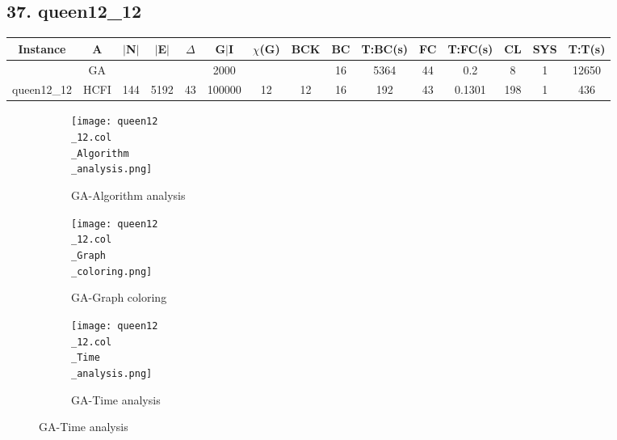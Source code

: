 \documentclass[10pt]{article}
\begin{document}
\subsection*{\hspace{0,9073976cm} 37. queen12\_12}
\begin{table}[H]
\centering
\begin{tabular}{|c|c|c|c|c|c|c|c|c|c|c|c|c|c|c|}
\hline
Instance& A &$|$N$|$ & $|$E$|$ & $\Delta$ & G$|$I & $\chi$(G) &BCK&BC & T:BC(s) & FC & T:FC(s) & CL & SYS & T:T(s) \\ \hline \hline

	&GA&       &                   &                     &   2000      &     \cellcolor{yellow} & {\cellcolor{yellow}}& {{\cellcolor{green}16}}
&5364   &44        &0.2                   &8                    &1          &12650        \\ \cline{2-2} \cline{6-6} \cline{9-15}
 \multirow{-2}{*}{queen12\_12} &HCFI   &\multirow{-2}{*}{144}   &\multirow{-2}{*}{5192}     &\multirow{-2}{*}{43}     &100000     &\multirow{-2}{*}{\cellcolor{yellow}12}      & \multirow{-2}{*}{\cellcolor{yellow}12}    &{\cellcolor{green}16}     &192         &43    &0.1301         &198    &1     &436        \\ \hline 
\end{tabular}
\end{table}
\graphicspath{{./Core1/Solutions/GA/queen12\_12.col}}
\begin{figure}[H]
\begin{subfigure}{.33\textwidth}
  \centering
  \texttt{[image: queen12\\\_12.col\\\_Algorithm\\\_analysis.png]}
  \caption{GA-Algorithm analysis}
   \label{fig:subfig1}
\end{subfigure}%
\begin{subfigure}{.33\textwidth}
  \centering
  \texttt{[image: queen12\\\_12.col\\\_Graph\\\_coloring.png]}
  \caption{GA-Graph coloring}
  \label{fig:subfig2}
\end{subfigure}
\begin{subfigure}{.33\textwidth}
  \centering
  \texttt{[image: queen12\\\_12.col\\\_Time\\\_analysis.png]}
  \caption{GA-Time analysis}
  \end{subfigure}
\end{figure}
\end{document}
